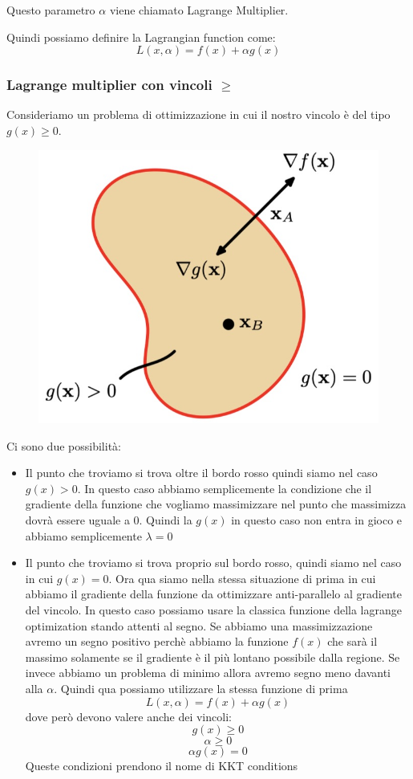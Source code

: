\documentclass[14pt]{extreport}
\begin{document}
Questo parametro $\alpha$ viene chiamato Lagrange Multiplier.

Quindi possiamo definire la Lagrangian function come: $$L(x, \alpha) = f(x) + \alpha g(x)$$

\subsubsection{Lagrange multiplier con vincoli $\geq$}

Consideriamo un problema di ottimizzazione in cui il nostro vincolo è del tipo $g(x) \geq 0$.

\begin{figure}[H]
\centering
\includegraphics[width=0.5\linewidth]{349.jpeg}
\end{figure}

Ci sono due possibilità:

\begin{itemize}

\item Il punto che troviamo si trova oltre il bordo rosso quindi siamo nel caso $g(x) > 0$. In questo caso abbiamo semplicemente la condizione che il
gradiente della funzione che vogliamo massimizzare nel punto che massimizza dovrà essere uguale a 0. Quindi la $g(x)$ in questo caso non entra in
gioco e abbiamo semplicemente $\lambda = 0$
\item Il punto che troviamo si trova proprio sul bordo rosso, quindi siamo nel caso in cui $g(x) = 0$. Ora qua siamo nella stessa situazione di prima
in cui abbiamo il gradiente della funzione da ottimizzare anti-parallelo al gradiente del vincolo. In questo caso possiamo usare la classica funzione
della lagrange optimization stando attenti al segno. Se abbiamo una massimizzazione avremo un segno positivo perchè abbiamo la funzione $f(x)$ che
sarà il massimo solamente se il gradiente è il più lontano possibile dalla regione. Se invece abbiamo un problema di minimo allora avremo segno meno
davanti alla $\alpha$. Quindi qua possiamo utilizzare la stessa funzione di prima $$L(x, \alpha) = f(x) + \alpha g(x)$$ dove però devono valere anche
dei vincoli: $$g(x) \geq 0$$ $$\alpha \geq 0$$ $$\alpha g(x) = 0$$ Queste condizioni prendono il nome di KKT conditions
\end{itemize}
\end{document}

